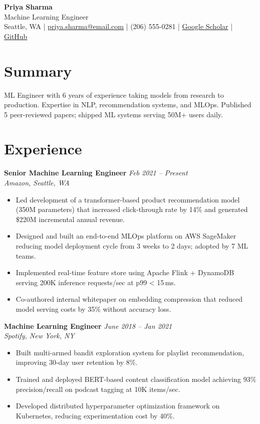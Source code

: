 \documentclass[11pt,a4paper]{article}
\begin{document}
\begin{center}
  {\LARGE \textbf{Priya Sharma}}\\[3pt]
  {\large \textcolor{accent}{Machine Learning Engineer}}\\[4pt]
  Seattle, WA \quad|\quad
  \href{mailto:priya.sharma@email.com}{priya.sharma@email.com} \quad|\quad
  (206) 555-0281 \quad|\quad
  \href{https://example.com/scholar/priyasharma}{Google Scholar} \quad|\quad
  \href{https://github.com/priyasharma-ml}{GitHub}
\end{center}

\section{Summary}
ML Engineer with 6 years of experience taking models from research to production. Expertise in NLP, recommendation systems, and MLOps. Published 5 peer-reviewed papers; shipped ML systems serving 50M+ users daily.

\section{Experience}

\noindent\textbf{Senior Machine Learning Engineer} \hfill \textit{Feb 2021 -- Present}\\
\textit{Amazon, Seattle, WA}
\begin{itemize}
  \item Led development of a transformer-based product recommendation model (350M parameters) that increased click-through rate by 14\% and generated \$220M incremental annual revenue.
  \item Designed and built an end-to-end MLOps platform on AWS SageMaker reducing model deployment cycle from 3 weeks to 2 days; adopted by 7 ML teams.
  \item Implemented real-time feature store using Apache Flink + DynamoDB serving 200K inference requests/sec at p99 < 15\,ms.
  \item Co-authored internal whitepaper on embedding compression that reduced model serving costs by 35\% without accuracy loss.
\end{itemize}

\vspace{4pt}
\noindent\textbf{Machine Learning Engineer} \hfill \textit{June 2018 -- Jan 2021}\\
\textit{Spotify, New York, NY}
\begin{itemize}
  \item Built multi-armed bandit exploration system for playlist recommendation, improving 30-day user retention by 8\%.
  \item Trained and deployed BERT-based content classification model achieving 93\% precision/recall on podcast tagging at 10K items/sec.
  \item Developed distributed hyperparameter optimization framework on Kubernetes, reducing experimentation cost by 40\%.
\end{itemize}
\end{document}
